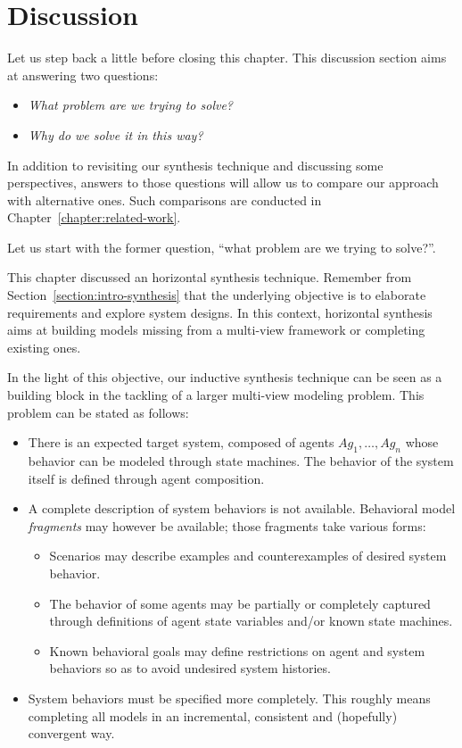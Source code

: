 \section{Discussion\label{section:inductive-discussion}}

Let us step back a little before closing this chapter. This discussion section aims at answering two questions:
\begin{itemize}
\item \emph{What problem are we trying to solve?}
\item \emph{Why do we solve it in this way?}
\end{itemize}
In addition to revisiting our synthesis technique and discussing some perspectives, answers to those questions will allow us to compare our approach with alternative ones. Such comparisons are conducted in Chapter~\ref{chapter:related-work}. 

Let us start with the former question, ``what problem are we trying to solve?''. 

This chapter discussed an horizontal synthesis technique. Remember from Section~\ref{section:intro-synthesis} that the underlying objective is to elaborate requirements and explore system designs. In this context, horizontal synthesis aims at building models missing from a multi-view framework or completing existing ones.

In the light of this objective, our inductive synthesis technique can be seen as a building block in the tackling of a larger multi-view modeling problem. This problem can be stated as follows:
\begin{itemize}
\item There is an expected target system, composed of agents $Ag_1, \ldots, Ag_n$ whose behavior can be modeled through state machines. The behavior of the system itself is defined through agent composition.
\item A complete description of system behaviors is not available. Behavioral model \emph{fragments} may however be available; those fragments take various forms:
\begin{itemize}
\item Scenarios may describe examples and counterexamples of desired system behavior.
\item The behavior of some agents may be partially or completely captured through definitions of agent state variables and/or known state machines.
\item Known behavioral goals may define restrictions on agent and system behaviors so as to avoid undesired system histories.
\end{itemize}
\item System behaviors must be specified more completely. This roughly means completing all models in an incremental, consistent and (hopefully) convergent way.
\end{itemize}

